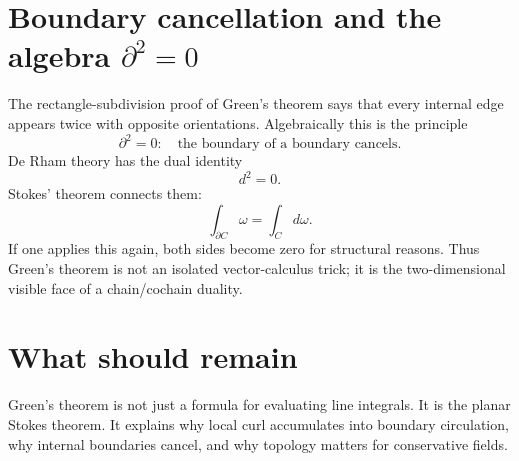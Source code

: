 \section{Boundary cancellation and the algebra \texorpdfstring{$\partial^2=0$}{boundary squared is zero}}

The rectangle-subdivision proof of Green's theorem says that every internal edge appears twice with opposite orientations.  Algebraically this is the principle
\[
  \partial^2=0:
  \quad \text{the boundary of a boundary cancels.}
\]
De Rham theory has the dual identity
\[
  d^2=0.
\]
Stokes' theorem connects them:
\[
  \int_{\partial C}\omega=\int_C d\omega.
\]
If one applies this again, both sides become zero for structural reasons.  Thus Green's theorem is not an isolated vector-calculus trick; it is the two-dimensional visible face of a chain/cochain duality.

\section{What should remain}

Green's theorem is not just a formula for evaluating line integrals.  It is the planar Stokes theorem.  It explains why local curl accumulates into boundary circulation, why internal boundaries cancel, and why topology matters for conservative fields.
